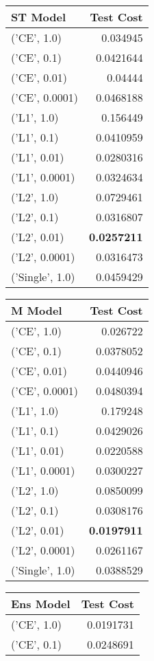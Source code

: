 \begin{tabular}{lr}
\hline
 ST Model        &   Test Cost \\
\hline
 ('CE', 1.0)     &   0.034945  \\
 ('CE', 0.1)     &   0.0421644 \\
 ('CE', 0.01)    &   0.04444   \\
 ('CE', 0.0001)  &   0.0468188 \\
 ('L1', 1.0)     &   0.156449  \\
 ('L1', 0.1)     &   0.0410959 \\
 ('L1', 0.01)    &   0.0280316 \\
 ('L1', 0.0001)  &   0.0324634 \\
 ('L2', 1.0)     &   0.0729461 \\
 ('L2', 0.1)     &   0.0316807 \\
 ('L2', 0.01)    &   {\bf 0.0257211} \\
 ('L2', 0.0001)  &   0.0316473 \\
 ('Single', 1.0) &   0.0459429 \\
\hline
\end{tabular}\begin{tabular}{lr}
\hline
 M Model         &   Test Cost \\
\hline
 ('CE', 1.0)     &   0.026722  \\
 ('CE', 0.1)     &   0.0378052 \\
 ('CE', 0.01)    &   0.0440946 \\
 ('CE', 0.0001)  &   0.0480394 \\
 ('L1', 1.0)     &   0.179248  \\
 ('L1', 0.1)     &   0.0429026 \\
 ('L1', 0.01)    &   0.0220588 \\
 ('L1', 0.0001)  &   0.0300227 \\
 ('L2', 1.0)     &   0.0850099 \\
 ('L2', 0.1)     &   0.0308176 \\
 ('L2', 0.01)    &   {\bf 0.0197911} \\
 ('L2', 0.0001)  &   0.0261167 \\
 ('Single', 1.0) &   0.0388529 \\
\hline
\end{tabular}\begin{tabular}{lr}
\hline
 Ens Model       &   Test Cost \\
\hline
 ('CE', 1.0)     &   0.0191731 \\
 ('CE', 0.1)     &   0.0248691 \\

\end{tabular}
